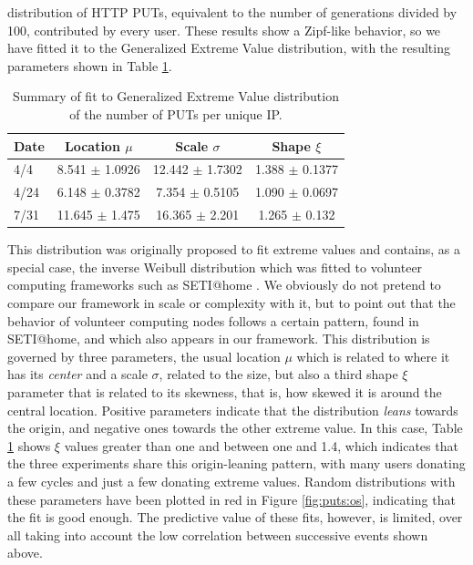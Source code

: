 \documentclass{sig-alternate}
\begin{document}
distribution of HTTP PUTs, equivalent to the number of
generations divided by 100, contributed by every user. These results show a Zipf-like behavior,
so we have fitted it to the Generalized Extreme Value distribution,
with the resulting parameters shown in Table \ref{tab:puts:os}.
%
\begin{table}
\caption{Summary of fit to Generalized Extreme Value distribution of
  the number of PUTs per unique IP. \label{tab:puts:os}}
\begin{center}
\begin{tabular}{l|ccc}
\hline
Date  & Location $\mu$ & Scale $\sigma$ & Shape $\xi$ \\
\hline
4/4 &  8.541 $\pm$ 1.0926  &    12.442 $\pm$ 1.7302 &  1.388 $\pm$
0.1377 \\
4/24 & 6.148 $\pm$ 0.3782 & 7.354 $\pm$ 0.5105 & 1.090 $\pm$  0.0697  \\
7/31 & 11.645 $\pm$ 1.475 & 16.365 $\pm$ 2.201 &  1.265 $\pm$ 0.132   \\
\hline
\end{tabular}
\end{center}
\end{table}
%
This distribution was originally proposed to fit extreme values
\cite{resnick2013extreme} and contains, as a special case, the inverse
Weibull distribution which was fitted to volunteer computing
frameworks such as SETI@home \cite{javadi2009mining}. We obviously do
not pretend to compare our framework in scale or complexity with it, but
to point out that the behavior of volunteer computing nodes follows a
certain pattern, found in SETI@home, and which also appears in our framework. This
distribution is governed by three parameters, the usual location $\mu$
which is related to where it has its {\em center} and a scale $\sigma$,
related to the size, but also a third shape $\xi$ parameter that is
related to its skewness, that is, how skewed it is around the central
location. Positive parameters indicate that the distribution {\em
  leans} towards the origin, and negative ones towards the other extreme
value. In this case, Table \ref{tab:puts:os} shows $\xi$ values
greater than one and between one and 1.4, which indicates that the
three experiments share this origin-leaning pattern, with many users
donating a few cycles and just a few donating extreme values. Random
distributions with these parameters have been plotted in red in
Figure \ref{fig:puts:os}, indicating that the fit is good enough. The
predictive value of these fits, however, is limited, over all taking
into account the low correlation between successive events shown
above.
\end{document}
